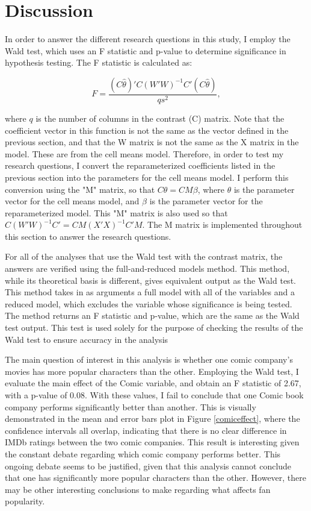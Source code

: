 \documentclass{svproc}
\begin{document}
\section{Discussion}

In order to answer the different research questions in this study, I employ the Wald test, which uses an F statistic and p-value to determine significance in hypothesis testing. The F statistic is calculated as:

\begin{equation}
F= \frac{(C \hat{\theta})'C(W'W)^{-1}C'(C \hat{\theta})}{qs^2} ,
\end{equation}

where $q$ is the number of columns in the contrast (C) matrix. Note that the coefficient vector in this function is not the same as the vector defined in the previous section, and that the W matrix is not the same as the X matrix in the model. These are from the cell means model. Therefore, in order to test my research questions, I convert the reparameterized coefficients listed in the previous section into the parameters for the cell means model. I perform this conversion using the "M" matrix, so that $C \theta=C M \beta$, where $\theta$ is the parameter vector for the cell means model, and $\beta$ is the parameter vector for the reparameterized model. This "M" matrix is also used so that $C(W'W)^{-1}C' = C M(X'X)^{-1}C' M$. The M matrix is implemented throughout this section to answer the research questions. 

For all of the analyses that use the Wald test with the contrast matrix, the answers are verified using the full-and-reduced models method. This method, while its theoretical basis is different, gives equivalent output as the Wald test. This method takes in as arguments a full model with all of the variables and a reduced model, which excludes the variable whose significance is being tested. The method returns an F statistic and p-value, which are the same as the Wald test output. This test is used solely for the purpose of checking the results of the Wald test to ensure accuracy in the analysis 

The main question of interest in this analysis is whether one comic company's movies has more popular characters than the other. Employing the Wald test, I evaluate the main effect of the Comic variable, and obtain an F statistic of 2.67, with a p-value of 0.08. With these values, I fail to conclude that one Comic book company performs significantly better than another. This is visually demonstrated in the mean and error bars plot in Figure \ref{comiceffect}, where the confidence intervals all overlap, indicating that there is no clear difference in IMDb ratings between the two comic companies. This result is interesting given the constant debate regarding which comic company performs better. This ongoing debate seems to be justified, given that this analysis cannot conclude that one has significantly more popular characters than the other. However, there may be other interesting conclusions to make regarding what affects fan popularity.
\end{document}
